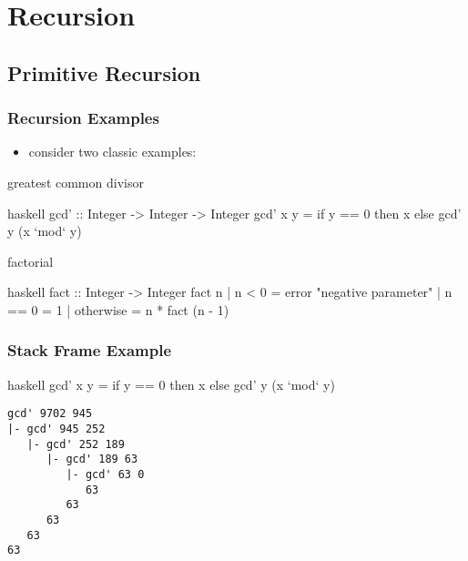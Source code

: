 \documentclass[dvipsnames]{beamer}
\theoremstyle{plain}
\begin{document}
\section{Recursion}

\subsection{Primitive Recursion}

\begin{frame}[fragile]
  \frametitle{Recursion Examples}

  \begin{itemize}
    \item consider two classic examples:
  \end{itemize}

  \begin{exampleblock}{greatest common divisor}
    \begin{pygments}{haskell}
gcd' :: Integer -> Integer -> Integer
gcd' x y = if y == 0 then x else gcd' y (x `mod` y)
    \end{pygments}
  \end{exampleblock}

  \pause
  \begin{exampleblock}{factorial}
    \begin{pygments}{haskell}
fact :: Integer -> Integer
fact n
  | n < 0     = error "negative parameter"
  | n == 0    = 1
  | otherwise = n * fact (n - 1)
    \end{pygments}
  \end{exampleblock}
\end{frame}

\begin{frame}[fragile]
  \frametitle{Stack Frame Example}

  \begin{exampleblock}{}
    \begin{pygments}{haskell}
gcd' x y = if y == 0 then x else gcd' y (x `mod` y)
    \end{pygments}

    \pause
    \begin{verbatim}
gcd' 9702 945
|- gcd' 945 252
   |- gcd' 252 189
      |- gcd' 189 63
         |- gcd' 63 0
            63
         63
      63
   63
63
    \end{verbatim}
  \end{exampleblock}
\end{frame}
\end{document}
